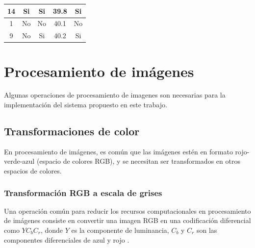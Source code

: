 \documentclass[twoside,spanish,ESP,MSc]{plantillaLabUPV}
\theoremstyle{definition}
\begin{document}
\begin{table}[h]
\begin{tabular}{|c|c|c|c|c|}
		14          & Si           & Si                                                                     & 39.8              & Si             \\ \hline
		1           & No           & No                                                                     & 40.1              & No             \\ \hline
		9           & No           & Si                                                                     & 40.2              & Si             \\ \hline

	\end{tabular}
\end{table}





\section{Procesamiento de imágenes}
Algunas operaciones de procesamiento de imagenes son necesarias para la implementación del sistema propuesto en este trabajo. 


\subsection{Transformaciones de color}

En procesamiento de imágenes, es común que las imágenes estén en formato rojo-verde-azul (espacio de colores RGB), y se necesitan ser transformados en otros espacios de colores. 

\subsubsection{Transformación RGB a escala de grises}

Una operación común para reducir los recursos computacionales en procesamiento de imágenes consiste en convertir una imagen RGB en una codificación diferencial como $YC_bC_r$, donde $Y$ es la componente de luminancia, $C_b$ y $C_r$ son las componentes diferenciales de azul y rojo \cite{Book_IVSS}.\\
\end{document}
